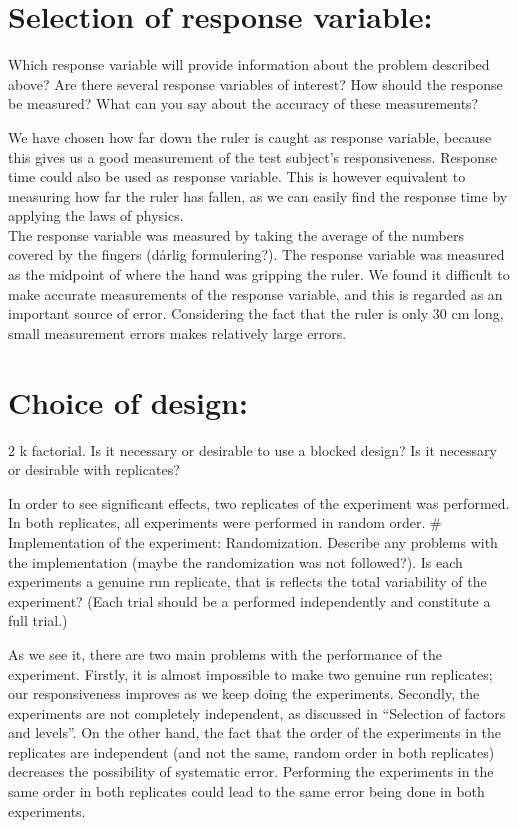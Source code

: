 \documentclass[]{article}
\begin{document}
\section{Selection of response
variable:}\label{selection-of-response-variable}

Which response variable will provide information about the problem
described above? Are there several response variables of interest? How
should the response be measured? What can you say about the accuracy of
these measurements?

We have chosen how far down the ruler is caught as response variable,
because this gives us a good measurement of the test subject's
responsiveness. Response time could also be used as response variable.
This is however equivalent to measuring how far the ruler has fallen, as
we can easily find the response time by applying the laws of physics.\\
The response variable was measured by taking the average of the numbers
covered by the fingers (dårlig formulering?). The response variable was
measured as the midpoint of where the hand was gripping the ruler. We
found it difficult to make accurate measurements of the response
variable, and this is regarded as an important source of error.
Considering the fact that the ruler is only 30 cm long, small
measurement errors makes relatively large errors.

\section{Choice of design:}\label{choice-of-design}

2 k factorial. Is it necessary or desirable to use a blocked design? Is
it necessary or desirable with replicates?

In order to see significant effects, two replicates of the experiment
was performed. In both replicates, all experiments were performed in
random order. \# Implementation of the experiment: Randomization.
Describe any problems with the implementation (maybe the randomization
was not followed?). Is each experiments a genuine run replicate, that is
reflects the total variability of the experiment? (Each trial should be
a performed independently and constitute a full trial.)

As we see it, there are two main problems with the performance of the
experiment. Firstly, it is almost impossible to make two genuine run
replicates; our responsiveness improves as we keep doing the
experiments. Secondly, the experiments are not completely independent,
as discussed in ``Selection of factors and levels''. On the other hand,
the fact that the order of the experiments in the replicates are
independent (and not the same, random order in both replicates)
decreases the possibility of systematic error. Performing the
experiments in the same order in both replicates could lead to the same
error being done in both experiments.
\end{document}
